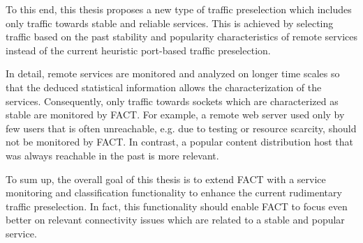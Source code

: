 To this end, this thesis proposes a new type of traffic preselection which 
includes only traffic towards stable and reliable services. This is achieved by 
selecting traffic based on the past stability and popularity characteristics of 
remote services instead of the current heuristic port-based traffic preselection.

In detail, remote services are monitored and analyzed on longer time scales so
that the deduced statistical information allows the characterization of the services. Consequently, only traffic towards sockets which are characterized as stable are monitored by FACT. For example, a remote web server used only by
few users that is often unreachable, e.g. due to testing or resource scarcity,
should not be monitored by FACT. In contrast, a popular content distribution host that was always reachable in the past is more relevant. 

To sum up, the overall goal of this thesis is to extend FACT with a service
monitoring and classification functionality to enhance the current rudimentary 
traffic preselection. In fact, this functionality should enable FACT to focus 
even better on relevant connectivity issues which are related to a stable and 
popular service.

